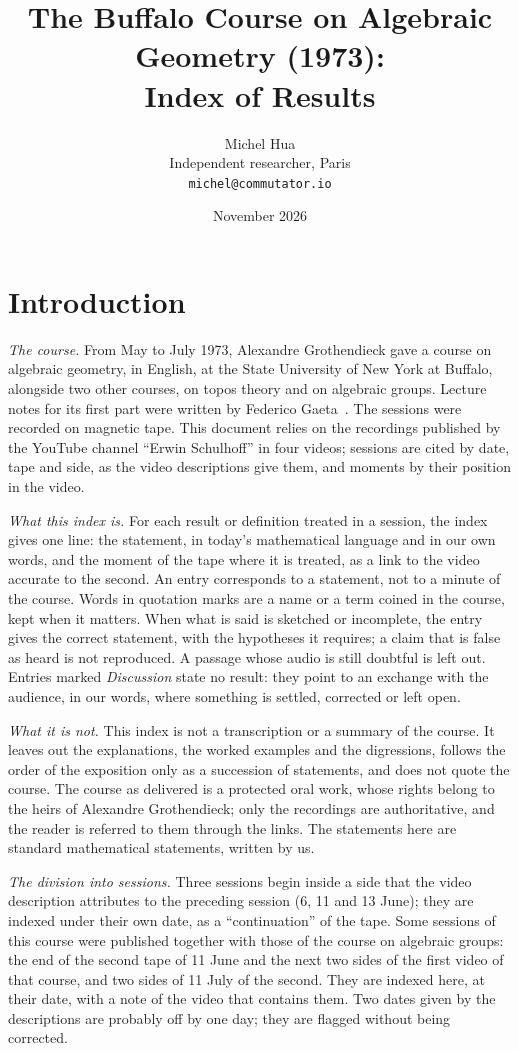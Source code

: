 \documentclass[11pt]{article}
\title{\LARGE The Buffalo Course on Algebraic Geometry (1973):\\ Index of Results}
\author{Michel Hua\\ \small Independent researcher, Paris\\ \small \texttt{michel@commutator.io}}
\date{\small November 2026}
\newcommand{\q}[1]{``#1''}
\begin{document}
\maketitle\thispagestyle{empty}
\newpage
\tableofcontents
\newpage

\section*{Introduction}

\emph{The course.} From May to July 1973, Alexandre Grothendieck gave a course on algebraic geometry, in English, at the State University of New York at Buffalo, alongside two other courses, on topos theory and on algebraic groups. Lecture notes for its first part were written by Federico Gaeta~\cite{gaeta}. The sessions were recorded on magnetic tape. This document relies on the recordings published by the YouTube channel \q{Erwin Schulhoff} in four videos; sessions are cited by date, tape and side, as the video descriptions give them, and moments by their position in the video.

\emph{What this index is.} For each result or definition treated in a session, the index gives one line: the statement, in today's mathematical language and in our own words, and the moment of the tape where it is treated, as a link to the video accurate to the second. An entry corresponds to a statement, not to a minute of the course. Words in quotation marks are a name or a term coined in the course, kept when it matters. When what is said is sketched or incomplete, the entry gives the correct statement, with the hypotheses it requires; a claim that is false as heard is not reproduced. A passage whose audio is still doubtful is left out. Entries marked \emph{Discussion} state no result: they point to an exchange with the audience, in our words, where something is settled, corrected or left open.

\emph{What it is not.} This index is not a transcription or a summary of the course. It leaves out the explanations, the worked examples and the digressions, follows the order of the exposition only as a succession of statements, and does not quote the course. The course as delivered is a protected oral work, whose rights belong to the heirs of Alexandre Grothendieck; only the recordings are authoritative, and the reader is referred to them through the links. The statements here are standard mathematical statements, written by us.

\emph{The division into sessions.} Three sessions begin inside a side that the video description attributes to the preceding session (6, 11 and 13 June); they are indexed under their own date, as a \q{continuation} of the tape. Some sessions of this course were published together with those of the course on algebraic groups: the end of the second tape of 11 June and the next two sides of the first video of that course, and two sides of 11 July of the second. They are indexed here, at their date, with a note of the video that contains them. Two dates given by the descriptions are probably off by one day; they are flagged without being corrected.
\end{document}
